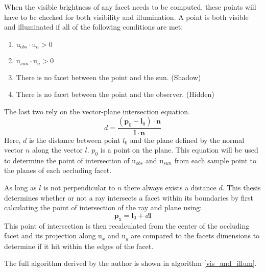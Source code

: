 When the visible brightness of any facet needs to be computed, these points will have to be checked for both visibility and illumination. A point is both visible and illuminated if all of the following conditions are met:
\begin{enumerate}
	\item $\bm{\mathrm{u}}_{obs}\cdotp \mathrm{u}_n > 0$
	\item $\bm{\mathrm{u}}_{sun}\cdotp \mathrm{u}_n > 0$
	\item There is no facet between the point and the sun. (Shadow)
	\item There is no facet between the point and the observer. (Hidden)
\end{enumerate}	
The last two rely on the vector-plane intersection equation.
\begin{equation}\label{eq:ray_distance}
d = \frac{(\bm{p}_0 - \bm{l}_0)\cdotp \bm{n}}{\bm{l}\cdotp \bm{n}}
\end{equation}
Here, $d$ is the distance between point $l_0$ and the plane defined by the normal vector $n$ along the vector $l$. $p_0$ is a point on the plane. This equation will be used to determine the point of intersection of $\bm{\mathrm{u}}_{obs}$ and $\bm{\mathrm{u}}_{sun}$ from each sample point to the planes of each occluding facet.

As long as $l$ is not perpendicular to $n$ there always exists a distance $d$. This thesis determines whether or not a ray intersects a facet within its boundaries by first calculating the point of intersection of the ray and plane using:
\begin{equation}\label{eq:intersection_pt}
\bm{p}_{\mathrm{x}} = \bm{l}_0 + d\bm{l}
\end{equation}
This point of intersection is then recalculated from the center of the occluding facet and its projection along $\bm{\mathrm{u}}_x$ and $\bm{\mathrm{u}}_y$ are compared to the facets dimensions to determine if it hit within the edges of the facet.

The full algorithm derived by the author is shown in algorithm \ref{vis_and_illum}.

